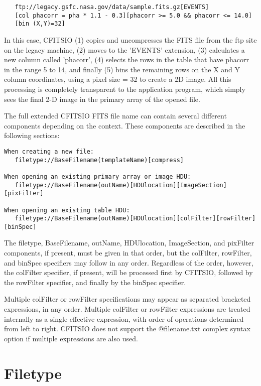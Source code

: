 \documentclass[11pt]{book}
\begin{document}
\begin{itemize}
\begin{verbatim}
   ftp://legacy.gsfc.nasa.gov/data/sample.fits.gz[EVENTS]
   [col phacorr = pha * 1.1 - 0.3][phacorr >= 5.0 && phacorr <= 14.0]
   [bin (X,Y)=32]
\end{verbatim}
In this case, CFITSIO (1) copies and uncompresses the FITS file from
the ftp site on the legacy machine, (2) moves to the 'EVENTS'
extension, (3) calculates a new column called 'phacorr', (4) selects
the rows in the table that have phacorr in the range 5 to 14, and
finally (5) bins the remaining rows on the X and Y column coordinates,
using a pixel size = 32 to create a 2D image.  All this processing is
completely transparent to the application program, which simply sees
the final 2-D image in the primary array of the opened file.
\end{itemize}

The full extended CFITSIO FITS file name can contain several different
components depending on the context.  These components are described in
the following sections:

\begin{verbatim}
When creating a new file:
   filetype://BaseFilename(templateName)[compress]

When opening an existing primary array or image HDU:
   filetype://BaseFilename(outName)[HDUlocation][ImageSection][pixFilter]

When opening an existing table HDU:
   filetype://BaseFilename(outName)[HDUlocation][colFilter][rowFilter][binSpec]
\end{verbatim}
The filetype, BaseFilename, outName, HDUlocation, ImageSection, and pixFilter
components, if present, must be given in that order, but the colFilter,
rowFilter, and binSpec specifiers may follow in any order.  Regardless
of the order, however, the colFilter specifier, if present, will be
processed first by CFITSIO, followed by the rowFilter specifier, and
finally by the binSpec specifier.  

Multiple colFilter or rowFilter specifications may appear as separated
bracketed expressions, in any order.  Multiple colFilter or rowFilter
expressions are treated internally as a single effective expression,
with order of operations determined from left to right.  CFITSIO does
not support the @filename.txt complex syntax option if multiple
expressions are also used.

\section{Filetype}
\end{document}
